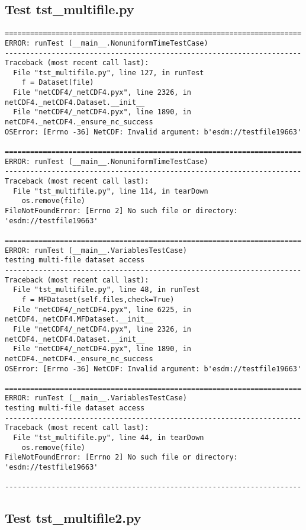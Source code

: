 \subsection{Test tst\_multifile.py}

\begin{verbatim}
======================================================================
ERROR: runTest (__main__.NonuniformTimeTestCase)
----------------------------------------------------------------------
Traceback (most recent call last):
  File "tst_multifile.py", line 127, in runTest
    f = Dataset(file)
  File "netCDF4/_netCDF4.pyx", line 2326, in netCDF4._netCDF4.Dataset.__init__
  File "netCDF4/_netCDF4.pyx", line 1890, in netCDF4._netCDF4._ensure_nc_success
OSError: [Errno -36] NetCDF: Invalid argument: b'esdm://testfile19663'

======================================================================
ERROR: runTest (__main__.NonuniformTimeTestCase)
----------------------------------------------------------------------
Traceback (most recent call last):
  File "tst_multifile.py", line 114, in tearDown
    os.remove(file)
FileNotFoundError: [Errno 2] No such file or directory: 'esdm://testfile19663'

======================================================================
ERROR: runTest (__main__.VariablesTestCase)
testing multi-file dataset access
----------------------------------------------------------------------
Traceback (most recent call last):
  File "tst_multifile.py", line 48, in runTest
    f = MFDataset(self.files,check=True)
  File "netCDF4/_netCDF4.pyx", line 6225, in netCDF4._netCDF4.MFDataset.__init__
  File "netCDF4/_netCDF4.pyx", line 2326, in netCDF4._netCDF4.Dataset.__init__
  File "netCDF4/_netCDF4.pyx", line 1890, in netCDF4._netCDF4._ensure_nc_success
OSError: [Errno -36] NetCDF: Invalid argument: b'esdm://testfile19663'

======================================================================
ERROR: runTest (__main__.VariablesTestCase)
testing multi-file dataset access
----------------------------------------------------------------------
Traceback (most recent call last):
  File "tst_multifile.py", line 44, in tearDown
    os.remove(file)
FileNotFoundError: [Errno 2] No such file or directory: 'esdm://testfile19663'

----------------------------------------------------------------------
\end{verbatim}

\subsection{Test tst\_multifile2.py}

